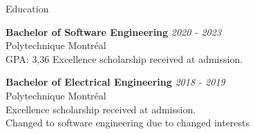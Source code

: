 \documentclass{resume} %
\begin{document}
	
	
	\begin{rSection}{Education}
		
		{\bf Bachelor of Software Engineering} \hfill {\em 2020 - 2023} 
		\\ Polytechnique Montréal
		\\GPA: 3,36 \hspace{0.5cm}  Excellence scholarship received at admission.

		{\bf Bachelor of Electrical Engineering} \hfill {\em 2018 - 2019} 
		\\ Polytechnique Montréal
		\\ Excellence scholarship received at admission.
		\\ Changed to software engineering due to changed interests
		
	\end{rSection}
	
\end{document}

